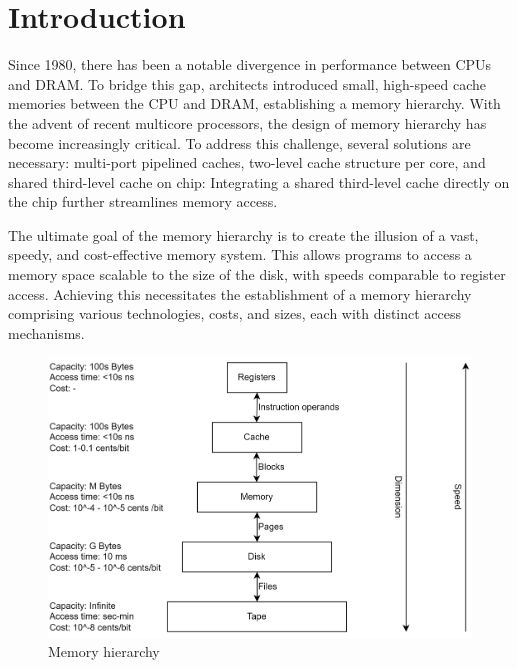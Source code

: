 \section{Introduction}

Since 1980, there has been a notable divergence in performance between CPUs and DRAM.
To bridge this gap, architects introduced small, high-speed cache memories between the CPU and DRAM, establishing a memory hierarchy.
With the advent of recent multicore processors, the design of memory hierarchy has become increasingly critical. 
To address this challenge, several solutions are necessary: multi-port pipelined caches, two-level cache structure per core, and shared third-level cache on chip: Integrating a shared third-level cache directly on the chip further streamlines memory access.

The ultimate goal of the memory hierarchy is to create the illusion of a vast, speedy, and cost-effective memory system.
This allows programs to access a memory space scalable to the size of the disk, with speeds comparable to register access. 
Achieving this necessitates the establishment of a memory hierarchy comprising various technologies, costs, and sizes, each with distinct access mechanisms.
\begin{figure}[H]
    \centering
    \includegraphics[width=0.7\linewidth]{images/hierarchy.png}
    \caption{Memory hierarchy}
\end{figure}